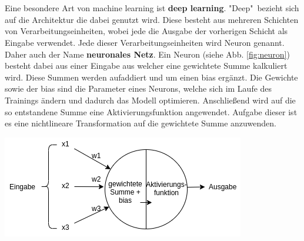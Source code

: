 \documentclass[
    12pt, %
    DIV10,
    ngerman, %
    a4paper, %
    oneside, %
    titlepage, %
    parskip=half, %
    headings=normal, %
    listof=totoc, %
    bibliography=totoc, %
    index=totoc, %
    captions=tableheading, %
    final %
]{scrreprt}
\begin{document}
\\\\
Eine besondere Art von machine learning ist \textbf{deep learning}. "Deep"\ bezieht sich auf die Architektur die dabei genutzt wird. Diese besteht aus mehreren Schichten von Verarbeitungseinheiten, wobei jede die Ausgabe der vorherigen Schicht als Eingabe verwendet. Jede dieser Verarbeitungseinheiten wird Neuron genannt. Daher auch der Name \textbf{neuronales Netz}. Ein Neuron (siehe Abb. \ref{fig:neuron}) besteht dabei aus einer Eingabe aus welcher eine gewichtete Summe kalkuliert wird. Diese Summen werden aufaddiert und um einen bias ergänzt. Die Gewichte sowie der bias sind die Parameter eines Neurons, welche sich im Laufe des Trainings ändern und dadurch das Modell optimieren. Anschlie{\ss}end wird auf die so entstandene Summe eine Aktivierungsfunktion angewendet. Aufgabe dieser ist es eine nichtlineare Transformation auf die gewichtete Summe anzuwenden.
\begin{center}
\includegraphics[scale=0.6]{img/neuron.png}
\label{fig:neuron}
\end{center}
\end{document}
